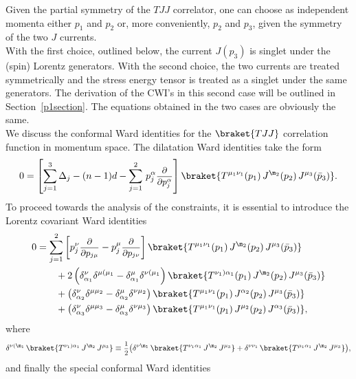 \documentclass[a4paper,11pt,openright,twoside]{book}
\let\a=\alpha   \let\b=\beta   \let\g=\gamma   \let\d=\delta
\let\n=\nu      \let\x=\xi     \let\p=\pi      \let\r=\rho
\newcommand{\sdfrac}[2]{\mbox{\small$\displaystyle\frac{#1}{#2}$}}
\newcommand{\secref}[1]{Section~\ref{#1}}		%
\numberwithin{equation}{section}
\begin{document}
{{{Given the partial symmetry of the $TJJ$ correlator, one can choose as independent momenta either $p_1$ and $p_2$ or, more conveniently, $p_2$ and $p_3$, given the symmetry of the two $J$ currents.\\
With the first choice, outlined below, the current $J(p_3)$ is singlet under the (spin) Lorentz generators. With the second choice, the two currents are treated symmetrically and the stress energy tensor is treated as a singlet under the same generators. The derivation of the CWI's in this second case will be outlined in \secref{p1section}. The equations obtained in the two cases are obviously the same. \\
We discuss the conformal Ward identities for the $\braket{TJJ}$ correlation function in momentum space. The dilatation Ward identities take the form
\begin{equation}
	0=\left[\sum_{j=1}^3\Delta_j-(n-1)d-\sum_{j=1}^2\,p_j^\a\sdfrac{\partial}{\partial p_j^\alpha}\right]\braket{{T^{\mu_1\nu_1}(p_1)\,J^{\m_2}(p_2)\,J^{\mu_3}(\bar p_3)}}.\label{DilatationTJJ}
\end{equation}
To proceed towards the analysis of the constraints, it is essential to introduce the Lorentz covariant Ward identities
\begin{align}
	0&=\sum_{j=1}^{2}\left[p_j^\nu\sdfrac{\partial}{\partial p_{j\mu}}-p_j^{\mu}\sdfrac{\partial}{\partial p_{j\nu}}\right]\braket{{T^{\mu_1\nu_1}(p_1)\,J^{\m_2}(p_2)\,J^{\mu_3}(\bar p_3)}}\notag\\
	&\qquad+2\left(\delta^{\nu}_{\a_1}\d^{\mu(\mu_1}-\delta^{\mu}_{\alpha_1}\delta^{\nu(\mu_1}\right)\braket{{T^{\nu_1)\alpha_1}(p_1)\,J^{\m_2}(p_2)\,J^{\mu_3}(\bar p_3)}}\notag\\
	&\qquad+\left(\delta^{\nu}_{\a_2}\d^{\mu\mu_2}-\delta^{\mu}_{\alpha_2}\delta^{\nu\mu_2}\right)\braket{{T^{\mu_1\nu_1}(p_1)\,J^{\alpha_2}(p_2)\,J^{\mu_3}(\bar p_3)}}\notag\\
	&\qquad+\left(\delta^{\nu}_{\a_3}\d^{\mu\mu_3}-\delta^{\mu}_{\alpha_3}\delta^{\nu\mu_3}\right)\braket{{T^{\mu_1\nu_1}(p_1)\,J^{\mu_2}(p_2)\,J^{\alpha_3}(\bar p_3)}}\label{RotationTJJ},
\end{align}
where 
\begin{equation}
	\d^{\n(\m_1}\,\braket{{T^{\nu_1)\alpha_1}\,J^{\m_2}\,J^{\mu_3}}}\equiv\sdfrac{1}{2}\big(\d^{\n\m_1}\,\braket{{T^{\nu_1\alpha_1}\,J^{\m_2}\,J^{\mu_3}}}+\d^{\n\n_1}\,\braket{{T^{\mu_1\alpha_1}\,J^{\m_2}\,J^{\mu_3}}}\big),
\end{equation}
and finally the special conformal Ward identities
}}}
\end{document}
